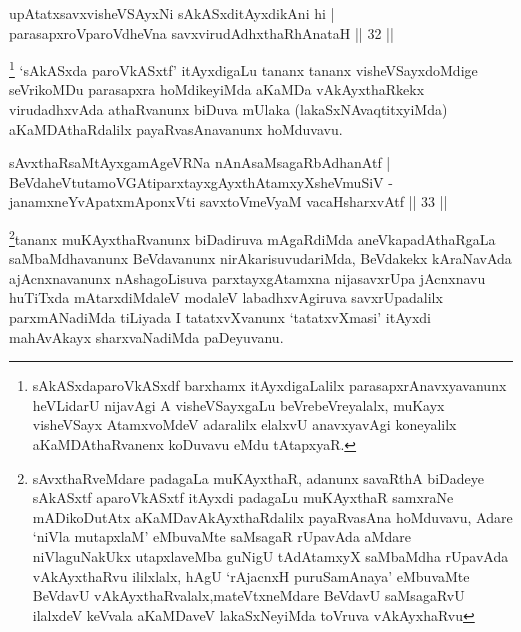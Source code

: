 
\begin{shl}
upAtatxsavxvisheVSAyxNi sAkASxditAyxdikAni hi |\\
parasapxroVparoVdheVna savxvirudAdhxthaRhAnataH \hfill || 32 ||
\end{shl}

\begin{artha}
\footnote{sAkASxdaparoVkASxdf barxhamx itAyxdigaLalilx parasapxrAnavxyavanunx heVLidarU nijavAgi A visheVSayxgaLu beVrebeVreyalalx, muKayx visheVSayx AtamxvoMdeV adaralilx elalxvU anavxyavAgi koneyalilx aKaMDAthaRvanenx koDuvavu eMdu tAtapxyaR.} `sAkASxda paroVkASxtf' itAyxdigaLu tananx tananx visheVSayxdoMdige seVrikoMDu parasapxra hoMdikeyiMda aKaMDa vAkAyxthaRkekx virudadhxvAda athaRvanunx biDuva mUlaka (lakaSxNAvaqtitxyiMda) aKaMDAthaRdalilx payaRvasAnavanunx hoMduvavu.
\end{artha}


\begin{shl}
sAvxthaRsaMtAyxgamAgeVRNa nAnAsaMsagaRbAdhanAtf |\\
BeVdaheVtutamoVGAtiparxtayxgAyxthAtamxyXsheVmuSiV -\\
 janamxneYvA\s \s patxmAponxVti savxtoV\s meVyaM vacaHsharxvAtf \hfill || 33 || 
\end{shl}

\begin{artha}
\footnote{sAvxthaRveMdare padagaLa muKAyxthaR, adanunx savaRthA biDadeye sAkASxtf aparoVkASxtf itAyxdi padagaLu muKAyxthaR samxraNe mADikoDutAtx aKaMDavAkAyxthaRdalilx payaRvasAna hoMduvavu, Adare `niVla mutapxlaM' eMbuvaMte saMsagaR rUpavAda aMdare niVlaguNakUkx utapxlaveMba guNigU tAdAtamxyX saMbaMdha rUpavAda vAkAyxthaRvu ililxlalx, hAgU `rAjacnxH puruSamAnaya' eMbuvaMte BeVdavU vAkAyxthaRvalalx,\break mateVtxneMdare BeVdavU saMsagaRvU ilalxdeV keVvala aKaMDaveV lakaSxNeyiMda toVruva vAkAyxhaRvu}tananx muKAyxthaRvanunx biDadiruva mAgaRdiMda aneVka\break padAthaRgaLa saMbaMdhavanunx BeVdavanunx nirAkarisuvudariMda, BeVdakekx kAraNavAda ajAcnxnavanunx nAshagoLisuva parxtayxgAtamxna nijasavxrUpa jAcnxnavu huTiTxda mAtarxdiMdaleV modaleV labadhxvAgiruva savxrUpadalilx parxmANadiMda tiLiyada I tatatxvXvanunx `tatatxvXmasi' itAyxdi mahAvAkayx sharxvaNadiMda paDeyuvanu.
\end{artha}

